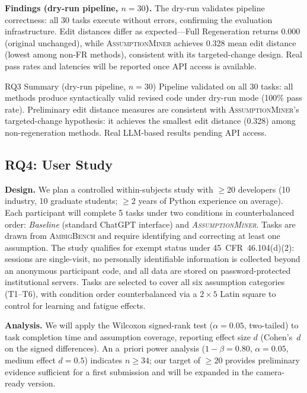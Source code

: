 \documentclass[sigconf,review,anonymous]{acmart}
\newcommand{\sysname}{\textsc{AssumptionMiner}\xspace}
\newcommand{\benchname}{\textsc{AmbigBench}\xspace}
\newcommand{\NumParticipants}{$\geq$20\xspace}
\begin{document}
\textbf{Findings (dry-run pipeline, $n=30$).}
The dry-run validates pipeline correctness: all 30 tasks execute without errors, confirming the evaluation infrastructure.
Edit distances differ as expected—Full Regeneration returns 0.000 (original unchanged), while \sysname achieves 0.328 mean edit distance (lowest among non-FR methods), consistent with its targeted-change design.
Real pass rates and latencies will be reported once API access is available.

\begin{rqbox}{RQ3 Summary (dry-run pipeline, $n=30$)}
Pipeline validated on all 30 tasks: all methods produce syntactically valid
revised code under dry-run mode (100\% pass rate).  Preliminary edit distance
measures are consistent with \sysname's targeted-change hypothesis: it achieves
the smallest edit distance (0.328) among non-regeneration methods.  Real
LLM-based results pending API access.
\end{rqbox}

\subsection{RQ4: User Study}
\label{sec:rq4}

\textbf{Design.}  We plan a controlled within-subjects study with
\NumParticipants developers (10 industry, 10 graduate
students; $\geq$2 years of Python experience on average).
Each participant will complete 5 tasks under two conditions in
counterbalanced order: \emph{Baseline} (standard ChatGPT interface) and
\emph{\sysname}.  Tasks are drawn from \benchname and require identifying and
correcting at least one assumption.
The study qualifies for exempt status under 45~CFR~46.104(d)(2): sessions are
single-visit, no personally identifiable information is collected beyond an
anonymous participant code, and all data are stored on password-protected
institutional servers.
Tasks are selected to cover all six assumption categories (T1--T6), with
condition order counterbalanced via a $2 \times 5$ Latin square to control
for learning and fatigue effects.

\textbf{Analysis.}  We will apply the Wilcoxon signed-rank test
($\alpha = 0.05$, two-tailed) to task completion time and assumption coverage,
reporting effect size $d$ (Cohen's~$d$ on the signed differences).
An a~priori power analysis ($1 - \beta = 0.80$, $\alpha = 0.05$,
medium effect $d = 0.5$) indicates $n \geq 34$; our target of $\geq 20$
provides preliminary evidence sufficient for a first submission and will be
expanded in the camera-ready version.
\end{document}
